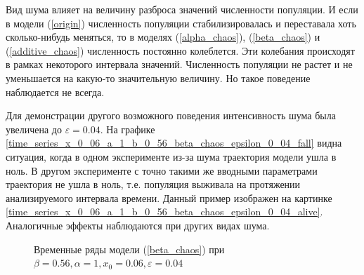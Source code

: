     Вид шума влияет на величину разброса значений численности популяции. И если в модели (\ref{origin}) численность популяции стабилизировалась и переставала хоть сколько-нибудь меняться, то в моделях (\ref{alpha_chaos}), (\ref{beta_chaos}) и (\ref{additive_chaos}) численность постоянно колеблется. Эти колебания происходят в рамках некоторого интервала значений. Численность популяции не растет и не уменьшается на какую-то значительную величину. Но такое поведение наблюдается не всегда.

    Для демонстрации другого возможного поведения интенсивность шума была увеличена до \(\varepsilon = 0.04\). На графике \ref{time_series_x_0_06_a_1_b_0_56_beta_chaos_epsilon_0_04_fall} видна ситуация, когда в одном эксперименте из-за шума траектория модели ушла в ноль. В другом эксперименте с точно такими же вводными параметрами траектория не ушла в ноль, т.е. популяция выживала на протяжении анализируемого интервала времени. Данный пример изображен на картинке \ref{time_series_x_0_06_a_1_b_0_56_beta_chaos_epsilon_0_04_alive}. Аналогичные эффекты наблюдаются при других видах шума.

    \begin{figure}
        \centering
        
        \captionsetup{justification=centering}
        \caption{Временные ряды модели (\ref{beta_chaos}) при \(\beta = 0.56, \alpha = 1, x_0 = 0.06, \varepsilon = 0.04\)}
    \end{figure}


